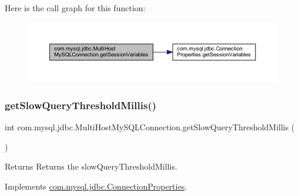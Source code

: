 Here is the call graph for this function\+:
\nopagebreak
\begin{figure}[H]
\begin{center}
\leavevmode
\includegraphics[width=350pt]{classcom_1_1mysql_1_1jdbc_1_1_multi_host_my_s_q_l_connection_a45d2ffee7d7d90c114e6b15180c7ebaf_cgraph}
\end{center}
\end{figure}
\mbox{\label{classcom_1_1mysql_1_1jdbc_1_1_multi_host_my_s_q_l_connection_a9ca9e74c9171ea4bed5d5218700ea951}} 
\subsubsection{\texorpdfstring{get\+Slow\+Query\+Threshold\+Millis()}{getSlowQueryThresholdMillis()}}
{\footnotesize\ttfamily int com.\+mysql.\+jdbc.\+Multi\+Host\+My\+S\+Q\+L\+Connection.\+get\+Slow\+Query\+Threshold\+Millis (\begin{DoxyParamCaption}{ }\end{DoxyParamCaption})}

\begin{DoxyReturn}{Returns}
Returns the slow\+Query\+Threshold\+Millis. 
\end{DoxyReturn}


Implements \mbox{\hyperlink{interfacecom_1_1mysql_1_1jdbc_1_1_connection_properties_a6c2698e485ad9ad410bceff09e3835f0}{com.\+mysql.\+jdbc.\+Connection\+Properties}}.

